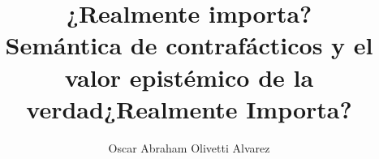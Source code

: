 \documentclass[letterpaper, 13pt, twoside, table, justified, 
nofonts, nobib, nohyper]{tufte-book}
\title{¿Realmente importa?\\  {\LARGE Semántica de contrafácticos y el valor epistémico de la verdad}}
\author[Oscar Abraham Olivetti Alvarez]{Oscar Abraham Olivetti Alvarez}
\begin{document}


\frontmatter
\maketitle

\title{¿Realmente Importa?} %


\setcounter{chapter}{-1}  %
\setcounter{secnumdepth}{3}
\setcounter{tocdepth}{3}


\begin{fullwidth}
	\tableofcontents
\end{fullwidth}






\mainmatter















\backmatter
\end{document}

